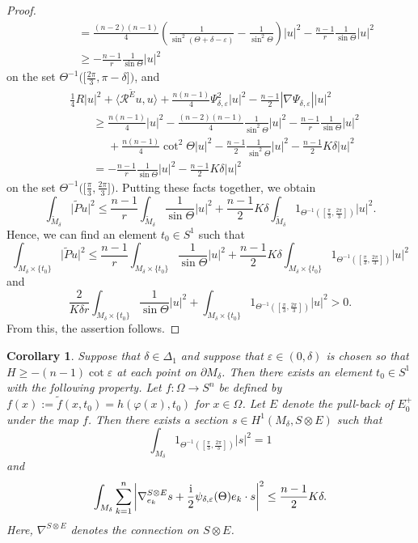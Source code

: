 \documentclass[pdftex]{sigma}
\numberwithin{equation}{section}
\newtheorem{Corollary}[Theorem]{Corollary}
\begin{document}
\begin{proof}
\begin{align*}
&\qquad= \frac{(n-2)(n-1)}{4} \left( \frac{1}{\sin^2 (\Theta+\delta-\varepsilon)} - \frac{1}{\sin^2 \Theta} \right) |u|^2 - \frac{n-1}{r} \frac{1}{\sin \Theta} |u|^2 \\
&\qquad\geq -\frac{n-1}{r} \frac{1}{\sin \Theta} |u|^2
\end{align*}
on the set $\Theta^{-1}\big(\big[\frac{2\pi}{3},\pi-\delta\big]\big)$, and
\begin{align*}
&\frac{1}{4} R |u|^2 + \big\langle \mathcal{R}^{\tilde{E}} u,u \big\rangle + \frac{n(n-1)}{4} \Psi_{\delta,\varepsilon}^2 |u|^2 - \frac{n-1}{2} |\nabla \Psi_{\delta,\varepsilon}| |u|^2 \\
&\qquad\geq \frac{n(n-1)}{4} |u|^2 - \frac{(n-2)(n-1)}{4} \frac{1}{\sin^2 \Theta} |u|^2 - \frac{n-1}{r} \frac{1}{\sin \Theta} |u|^2 \\
&\phantom{\qquad\geq}{} + \frac{n(n-1)}{4} \cot^2 \Theta |u|^2 - \frac{n-1}{2} \frac{1}{\sin^2 \Theta} |u|^2 - \frac{n-1}{2} K\delta |u|^2 \\
&\qquad= -\frac{n-1}{r} \frac{1}{\sin \Theta} |u|^2 - \frac{n-1}{2} K\delta |u|^2
\end{align*}
on the set $\Theta^{-1}\big(\big[\frac{\pi}{3},\frac{2\pi}{3}\big]\big)$.
Putting these facts together, we obtain
\[
 \int_{\tilde{M}_\delta} \big|\tilde{P} u\big|^2 \leq \frac{n-1}{r} \int_{\tilde{M}_\delta} \frac{1}{\sin \Theta} |u|^2 + \frac{n-1}{2} K\delta \int_{\tilde{M}_\delta} 1_{\Theta^{-1}([\frac{\pi}{3},\frac{2\pi}{3}])} |u|^2.
\]
Hence, we can find an element $t_0 \in S^1$ such that
\[
 \int_{M_\delta \times \{t_0\}} \big|\tilde{P} u\big|^2 \leq \frac{n-1}{r} \int_{M_\delta \times \{t_0\}} \frac{1}{\sin \Theta} |u|^2 + \frac{n-1}{2} K\delta \int_{M_\delta \times \{t_0\}} 1_{\Theta^{-1}([\frac{\pi}{3},\frac{2\pi}{3}])} |u|^2
\]
and
\[
 \frac{2}{K\delta r} \int_{M_\delta \times \{t_0\}} \frac{1}{\sin \Theta} |u|^2 + \int_{M_\delta \times \{t_0\}} 1_{\Theta^{-1}([\frac{\pi}{3},\frac{2\pi}{3}])} |u|^2 > 0.
\]
From this, the assertion follows.
\end{proof}

\begin{Corollary}
\label{limiting_spinor_even_dim_2}
Suppose that $\delta \in \Delta_1$ and suppose that $\varepsilon \in (0,\delta)$ is chosen so that $H \geq -{(n-1)} \cot \varepsilon$ at each point on $\partial M_\delta$. Then there exists an element $t_0 \in S^1$ with the following property.
Let $f\colon \Omega \to S^n$ be defined by $f(x) := \tilde{f}(x,t_0) = h(\varphi(x),t_0)$ for $x \in \Omega$. Let $E$ denote the pull-back of $E_0^+$ under the map $f$.
Then there exists a section $s \in H^1(M_\delta,S \otimes E)$ such that
\[\int_{M_\delta} 1_{\Theta^{-1}([\frac{\pi}{3},\frac{2\pi}{3}])} |s|^2 = 1\]
and
\[\int_{M_\delta} \sum_{k=1}^n \left| \nabla_{e_k}^{S \otimes E} s + \frac{\rm i}{2} \psi_{\delta,\varepsilon}(\Theta) e_k \cdot s \right|^2 \leq \frac{n-1}{2} K\delta.\]
Here, $\nabla^{S \otimes E}$ denotes the connection on $S \otimes E$.
\end{Corollary}
\end{document}
